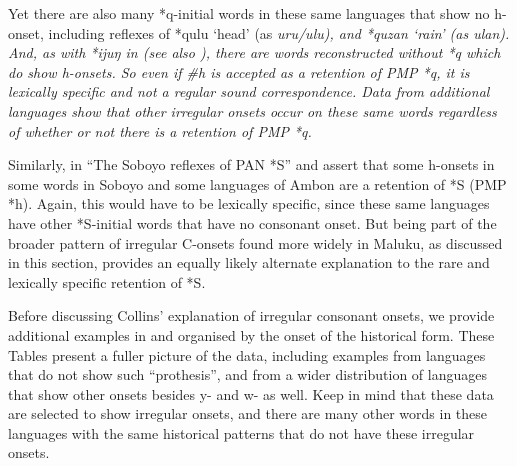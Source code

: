 Yet there are also many *q-initial words in these same languages
that show no h-onset,
including reflexes of *qulu ‘head’ (as \it{uru/ulu}),
and *quzan ‘rain’ (as \it{ulan}).
And, as with *ijuŋ in  (see also ),
there are words reconstructed without *q which do show h-onsets.
So even if {\#}h is accepted as a retention of PMP *q,
it is lexically specific
and not a regular sound correspondence.
Data from additional languages show that other irregular onsets
occur on these same words regardless of whether or not there
is a retention of PMP *q.

Similarly, \citet{Blust1981} in “The Soboyo reflexes of PAN *S”
and \citet{Collins1981} assert that some h-onsets in some words
in Soboyo and some languages of Ambon are a retention of  *S (PMP *h).
Again, this would have to be lexically specific,
since these same languages have other *S-initial words that have no consonant onset.
But being part of the broader pattern of irregular C-onsets found
more widely in Maluku,
as discussed in this section,
provides an equally likely alternate explanation to the rare
and lexically specific retention of  *S.

Before discussing Collins’ explanation of irregular consonant
onsets, we provide additional examples in 
and  organised by the onset of the historical form.
These Tables present a fuller picture of the data,
including examples from languages that do not show such “prothesis”,
and from a wider distribution of languages that show other onsets
besides y- and w- as well.
Keep in mind that these data are selected to show irregular onsets,
and there are many other words in these languages with the same
historical patterns that do not have these irregular onsets.

